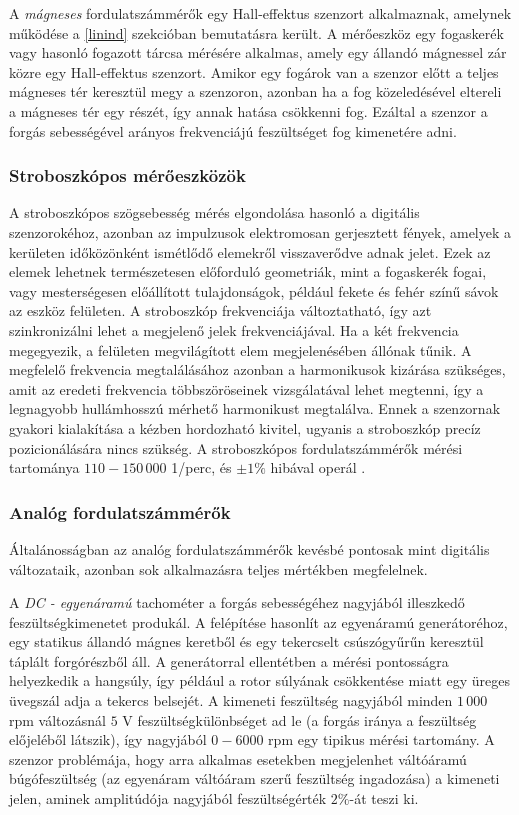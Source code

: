 A \textit{mágneses} fordulatszámmérők egy Hall-effektus szenzort alkalmaznak, amelynek működése a \ref{linind} szekcióban bemutatásra került. A mérőeszköz egy fogaskerék vagy hasonló fogazott tárcsa mérésére alkalmas, amely egy állandó mágnessel zár közre egy Hall-effektus szenzort. Amikor egy fogárok van a szenzor előtt a teljes mágneses tér keresztül megy a szenzoron, azonban ha a fog közeledésével eltereli a mágneses tér egy részét, így annak hatása csökkenni fog. Ezáltal a szenzor a forgás sebességével arányos frekvenciájú feszültséget fog kimenetére adni.

\subsubsection{Stroboszkópos mérőeszközök}

A stroboszkópos szögsebesség mérés elgondolása hasonló a digitális szenzorokéhoz, azonban az impulzusok elektromosan gerjesztett fények, amelyek a kerületen időközönként ismétlődő elemekről visszaverődve adnak jelet. Ezek az elemek lehetnek természetesen előforduló geometriák, mint a fogaskerék fogai, vagy mesterségesen előállított tulajdonságok, például fekete és fehér színű sávok az eszköz felületen. A stroboszkóp frekvenciája változtatható, így azt szinkronizálni lehet a megjelenő jelek frekvenciájával. Ha a két frekvencia megegyezik, a felületen megvilágított elem megjelenésében állónak tűnik. A megfelelő frekvencia megtalálásához azonban a harmonikusok kizárása szükséges, amit az eredeti frekvencia többszöröseinek vizsgálatával lehet megtenni, így a legnagyobb hullámhosszú mérhető harmonikust megtalálva. Ennek a szenzornak gyakori kialakítása a kézben hordozható kivitel, ugyanis a stroboszkóp precíz pozicionálására nincs szükség. A stroboszkópos fordulatszámmérők mérési tartománya $110 - 150\,000$ 1/perc, és $\pm1\%$ hibával operál \cite{Morris2016b}.

\subsubsection{Analóg fordulatszámmérők}

Általánosságban az analóg fordulatszámmérők kevésbé pontosak mint digitális változataik, azonban sok alkalmazásra teljes mértékben megfelelnek.

A \textit{DC - egyenáramú} tachométer a forgás sebességéhez nagyjából illeszkedő feszültségkimenetet produkál. A felépítése hasonlít az egyenáramú generátoréhoz, egy statikus állandó mágnes keretből és egy tekercselt csúszógyűrűn keresztül táplált forgórészből áll. A generátorral ellentétben a mérési pontosságra helyezkedik a hangsúly, így például a rotor súlyának csökkentése miatt egy üreges üvegszál adja a tekercs belsejét. A kimeneti feszültség nagyjából minden $1\,000$ rpm változásnál $5$ V feszültségkülönbséget ad le (a forgás iránya a feszültség előjeléből látszik), így nagyjából $0-6000$ rpm egy tipikus mérési tartomány. A szenzor problémája, hogy arra alkalmas esetekben megjelenhet váltóáramú búgófeszültség (az egyenáram váltóáram szerű feszültség ingadozása) a kimeneti jelen, aminek amplitúdója nagyjából feszültségérték $2\%$-át teszi ki.

